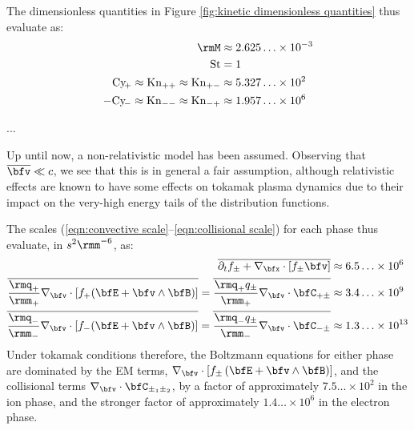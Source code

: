     The dimensionless quantities in Figure \ref{fig:kinetic dimensionless quantities} thus evaluate as:
    \begin{align}
                                                           \rmM  &\approx  2.625\ldots\times 10^{- 3}  \\
                                                          \rmSt  &=        1                           \\
          \rmCy\!_{+}  \approx  \rmKn_{++}  \approx  \rmKn_{+-}  &\approx  5.327\ldots\times 10^{2}    \\
        - \rmCy\!_{-}  \approx  \rmKn_{--}  \approx  \rmKn_{-+}  &\approx  1.957\ldots\times 10^{6}
    \end{align}

    ...

    \begin{remark}
        Up until now, a non-relativistic model has been assumed. Observing that $\overline{\bfv}  \ll  c$, we see that this is in general a fair assumption, although relativistic effects are known to have some effects on tokamak plasma dynamics due to their impact on the very-high energy tails of the distribution functions.
    \end{remark}

    The scales (\ref{eqn:convective scale}--\ref{eqn:collisional scale}) for each phase thus evaluate, in $s^{2}\rmm^{- 6}$, as:
    \begin{align}
        \overline{\partial_{t}f_{\pm} + \nabla_{\bfx}\cdot[f_{\pm}\bfv]}  &\approx  6.5\ldots\times 10^{6}  \\
        \overline{\frac{\rmq_{+}}{\rmm_{+}}\nabla_{\bfv}\cdot[f_{+}(\bfE + \bfv\wedge\bfB)]}  =  \overline{\frac{\rmq_{+}q_{\pm}}{\rmm_{+}}\nabla_{\bfv}\cdot\bfC_{+\pm}}  &\approx  3.4\ldots\times 10^{9}  \\
        \overline{\frac{\rmq_{-}}{\rmm_{-}}\nabla_{\bfv}\cdot[f_{-}(\bfE + \bfv\wedge\bfB)]}  =  \overline{\frac{\rmq_{-}q_{\pm}}{\rmm_{-}}\nabla_{\bfv}\cdot\bfC_{-\pm}}  &\approx  1.3\ldots\times 10^{13}
    \end{align}
    Under tokamak conditions therefore, the Boltzmann equations for either phase are dominated by the EM terms, $\nabla_{\bfv}\cdot[f_{\pm}\left(\bfE + \bfv\wedge\bfB\right)]$, and the collisional terms $\nabla_{\bfv}\cdot\bfC_{\pm_{1}\pm_{2}}$, by a factor of approximately $7.5\ldots\times 10^{2}$ in the ion phase, and the stronger factor of approximately $1.4\ldots\times 10^{6}$ in the electron phase. 
    

